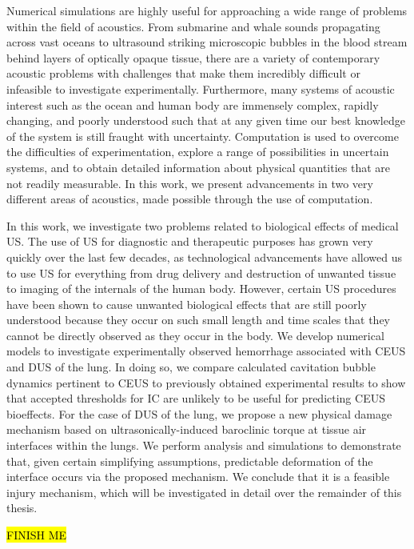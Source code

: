 \acresetall
Numerical simulations are highly useful for approaching a wide range
of problems within the field of acoustics. From submarine and whale
sounds propagating across vast oceans to ultrasound striking
microscopic bubbles in the blood stream behind layers of optically
opaque tissue, there are a variety of contemporary acoustic problems
with challenges that make them incredibly difficult or infeasible to
investigate experimentally. Furthermore, many systems of acoustic
interest such as the ocean and human body are immensely complex,
rapidly changing, and poorly understood such that at any given time
our best knowledge of the system is still fraught with
uncertainty. Computation is used to overcome the difficulties of
experimentation, explore a range of possibilities in uncertain
systems, and to obtain detailed information about physical quantities
that are not readily measurable. In this work, we present advancements
in two very different areas of acoustics, made possible through the
use of computation.

In this work, we investigate two problems related to
biological effects of medical \ac{US}. The use of \ac{US} for
diagnostic and therapeutic purposes has grown very quickly over the
last few decades, as technological advancements have allowed us to use
\ac{US} for everything from drug delivery and destruction of unwanted
tissue to imaging of the internals of the human body. However, certain
\ac{US} procedures have been shown to cause unwanted biological
effects that are still poorly understood because they occur on such
small length and time scales that they cannot be directly observed as
they occur in the body. We develop numerical models to investigate
experimentally observed hemorrhage associated with \ac{CEUS} and
\ac{DUS} of the lung. In doing so, we compare calculated cavitation
bubble dynamics pertinent to \ac{CEUS} to previously obtained
experimental results to show that accepted thresholds for \ac{IC} are
unlikely to be useful for predicting \ac{CEUS} bioeffects. For the
case of \ac{DUS} of the lung, we propose a new physical damage
mechanism based on ultrasonically-induced baroclinic torque at tissue
air interfaces within the lungs. We perform analysis and simulations
to demonstrate that, given certain simplifying assumptions, predictable
deformation of the interface occurs via the proposed mechanism. We
conclude that it is a feasible injury mechanism, which will be
investigated in detail over the remainder of this thesis.

\hl{FINISH ME}


